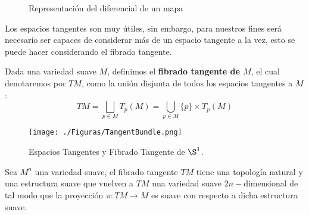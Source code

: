\begin{frame}
  \begin{figure}
    \centering
    
    \caption{Representación del diferencial de un mapa}
  \end{figure}
\end{frame}

\begin{frame}
  Los espacios tangentes son muy útiles, sin embargo, para nuestros fines será necesario ser capaces de considerar más de un espacio tangente a la vez, esto se puede hacer considerando el fibrado tangente.
  
\begin{definition}
  Dada una variedad suave $M$, definimos el \textbf{fibrado tangente de $M$}, el cual denotaremos por $TM$, como la unión disjunta de todos los espacios tangentes a $M$:
\[ TM = \bigsqcup_{p \in M} T_p(M) = \bigcup_{p \in M} \{p\} \times T_p(M) \]
\end{definition}
\end{frame}

\begin{frame}
  \centering
  \begin{figure}
  \texttt{[image: ./Figuras/TangentBundle.png]}
    \caption{Espacios Tangentes y Fibrado Tangente de $\S^{1}$.}
  \end{figure}
\end{frame}

\begin{frame}
  \begin{theorem}
    Sea $M^n$ una variedad suave, el fibrado tangente $TM$ tiene una topología natural y una estructura suave que vuelven a $TM$ una variedad suave $2n-$dimensional de tal modo que la proyección $\pi: TM \to M$ es suave con respecto a dicha estructura suave.
  \end{theorem}
\end{frame}


